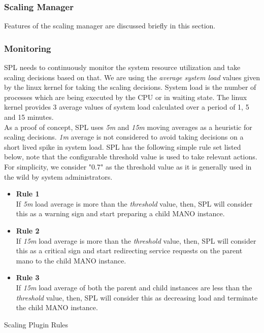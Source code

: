 \subsubsection{Scaling Manager}

Features of the scaling manager are discussed briefly in this section. 

\subsubsection*{Monitoring}

SPL needs to continuously monitor the system resource utilization and take scaling decisions based on that. We are using the \textit{average system load} values given by the linux kernel for taking the scaling decisions. System load is the number of processes which are being executed by the CPU or in waiting state. The linux kernel provides 3 average values of system load calculated over a period of 1, 5 and 15 minutes. \\

As a proof of concept, SPL uses \textit{5m} and \textit{15m} moving averages as a heuristic for scaling decisions. \textit{1m} average is not considered to avoid taking decisions on a short lived spike in system load. SPL has the following simple rule set listed below, note that the configurable threshold value is used to take relevant actions. For simplicity, we consider "0.7" as the threshold value as it is generally used in the wild by system administrators. 

\begin{enumeratelist}

\begin{itemize}
	\item{\textbf{Rule 1}\\} If \textit{5m} load average is more than the \textit{threshold} value, then, SPL will consider this as a warning sign and start preparing a child MANO instance.
	\item{\textbf{Rule 2}\\} If \textit{15m} load average is more than the \textit{threshold} value, then, SPL will consider this as a critical sign and start redirecting service requests on the parent mano to the child MANO instance.
	\item{\textbf{Rule 3}\\} If \textit{15m} load average of both the parent and child instances are less than the \textit{threshold} value, then, SPL will consider this as decreasing load and terminate the child MANO instance.

\end{itemize}
\caption{Scaling Plugin Rules}
\label{list:splrules}
\end{enumeratelist}


